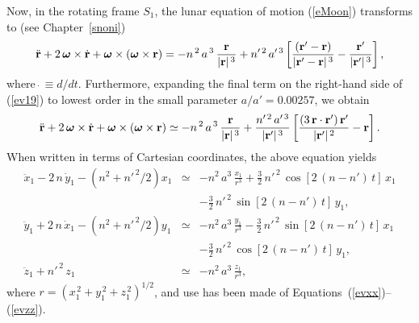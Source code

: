 Now, in the rotating frame $S_1$, the lunar equation of motion (\ref{eMoon}) transforms to (see Chapter~\ref{snoni})
 \begin{equation}
 \ddot{\bf r}+ 2\,\mbox{\boldmath$\omega$}\times\dot{\bf r} + \mbox{\boldmath$\omega$}\times (\mbox{\boldmath$\omega$}\times {\bf r})
 = - n^{\,2}\,a^{\,3}\,\frac{{\bf r}}{|{\bf r}|^{\,3}} + n'^{\,2}\,a'^{\,3}\left[\frac{({\bf r}'-{\bf r})}{|{\bf r}'-{\bf r}|^{\,3}}
 -\frac{{\bf r}'}{|{\bf r}'|^{\,3}}\right],\label{ev19}
 \end{equation}
 where $\dot{~}\equiv d/dt$. 
 Furthermore, expanding the final term on the right-hand side of (\ref{ev19}) to lowest order in the small parameter $a/a'=0.00257$, we obtain
 \begin{equation}
 \ddot{\bf r} +2\,\mbox{\boldmath$\omega$}\times\dot{\bf r}+\mbox{\boldmath$\omega$}\times (\mbox{\boldmath$\omega$}\times {\bf r})
 \simeq - n^{\,2}\,a^{\,3}\,\frac{{\bf r}}{|{\bf r}|^{\,3}} + \frac{n'^{\,2}\,a'^{\,3}}{|{\bf r'}|^{\,3}}\left[\frac{(3\,{\bf r}\cdot{\bf r}')\,{\bf r}'}{|{\bf r}'|^{\,2}} - {\bf r}\right].
 \end{equation}
 When written in terms of Cartesian coordinates, the above equation yields
 \begin{eqnarray}
 \ddot{x}_1 -2\,n\,\dot{y}_1-\left(n^2+n'^{\,2}/2\right)x_1&\simeq&-n^2\,a^3\,\frac{x_1}{r^3}+\frac{3}{2}\,n'^{\,2}\,\cos[2\,(n-n')\,t]\,x_1\nonumber\\[0.5ex]
 &&-\frac{3}{2}\,n'^{\,2}\,
 \sin[2\,(n-n')\,t]\,y_1,\label{ev21}\\[0.5ex]
 \ddot{y}_1+2\,n\,\dot{x}_1-\left(n^2+n'^{\,2}/2\right)y_1&\simeq&-n^2\,a^3\,\frac{y_1}{r^3}-\frac{3}{2}\,n'^{\,2}\,\sin[2\,(n-n')\,t]\,x_1\nonumber\\[0.5ex]
 &&-\frac{3}{2}\,n'^{\,2}\,
 \cos[2\,(n-n')\,t]\,y_1,\\[0.5ex]
 \ddot{z}_1 + n'^{\,2}\,z_1 &\simeq& - n^2\,a^3\,\frac{z_1}{r^3},\label{ev23}
 \end{eqnarray}
 where $r=(x_1^{\,2}+y_1^{\,2}+z_1^{\,2})^{1/2}$, and use has been made of Equations~(\ref{evxx})--(\ref{evzz}).
 
